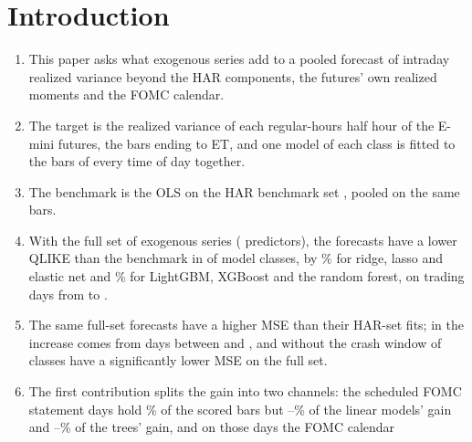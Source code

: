 \section{Introduction}
\label{sec:intro}

\begin{enumerate}
\item This paper asks what exogenous series add to a pooled forecast of intraday realized variance beyond the HAR
  components, the futures' own realized moments and the FOMC calendar.
\item The target is the realized variance of each regular-hours half hour of the E-mini \SPfh{} futures, the
  \rhorNBars{} bars ending \rhfipBarFirst{} to \rhfipBarLast{} ET, and one model of each class is fitted to the bars of
  every time of day together.
\item The benchmark is the OLS on the HAR benchmark set \citep{Corsi2009}, pooled on the same bars.
\item With the full set of \rhdmNSeriesPooled{} exogenous series (\rhorNColsAf{} predictors), the forecasts have a
  lower QLIKE than the benchmark in \rhorVsOlsFullLowerSig{} of \rhorVsOlsFullN{} model classes, by
  \rhorVsOlsRedLinRng\% for ridge, lasso and elastic net and \rhorVsOlsRedTreeRng\% for LightGBM, XGBoost and the random
  forest, on \rhorDays{} trading days from \rhorSpanStart{} to \rhorSpanEnd.
\item The same full-set forecasts have a higher MSE than their HAR-set fits; in \rhcaYearsOos{} the increase comes from
  \rhcaTopDays{} days between \rhcaTopFirstBarOos{} and \rhcaTopLastBarOos, and without the crash window
  \rhcaNMseLowerSigBarOosExCrash{} of \rhorVsOlsFullN{} classes have a significantly lower MSE on the full set.
\item The first contribution splits the gain into two channels: the \rhchNEventDays{} scheduled FOMC statement days
  hold \rhchEventBarPct\% of the scored bars but \rhchLinShareEventMin--\rhchLinShareEventMax\% of the linear models'
  gain and \rhchTreeShareEventMin--\rhchTreeShareEventMax\% of the trees' gain, and on those days the FOMC calendar

\end{enumerate}
